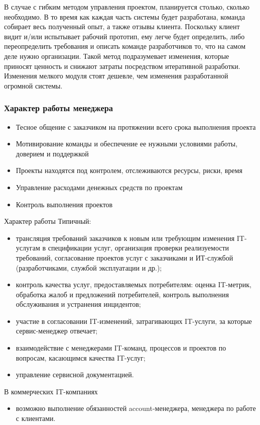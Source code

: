 \documentclass{../industrial-development}
\begin{document}
В случае с гибким методом управления проектом, планируется столько, сколько необходимо. В то время как каждая часть системы будет разработана, команда собирает весь полученный опыт, а также отзывы клиента. Поскольку клиент видит и/или испытывает рабочий прототип, ему легче будет определить, либо переопределить требования и описать команде разработчиков то, что на самом деле нужно организации. Такой метод подразумевает изменения, которые приносят ценность и снижают затраты посредством итеративной разработки. Изменения мелкого модуля стоят дешевле, чем изменения разработанной огромной системы.

\begin{frame} \frametitle{Характер работы менеджера}
\begin{itemize}
\item Тесное общение с заказчиком на протяжении всего срока выполнения проекта
\item Мотивирование команды и обеспечение ее нужными условиями работы, доверием и поддержкой
\item Проекты находятся под контролем, отслеживаются ресурсы, риски, время
\item Управление расходами денежных средств по проектам 
\item Контроль выполнения проектов
\end{itemize}
\end{frame}
\lecturenotes
Характер работы
Типичный:
\begin{itemize}
\item трансляция требований заказчиков к новым или требующим изменения IT-услугам в спецификации услуг, организация проверки реализуемости требований, согласование проектов услуг с заказчиками и ИТ-службой (разработчиками, службой эксплуатации и др.);
\item контроль качества услуг, предоставляемых потребителям: оценка IT-метрик, обработка жалоб и предложений потребителей, контроль выполнения обслуживания и устранения инцидентов;
\item участие в согласовании IT-изменений, затрагивающих IT-услуги, за которые сервис-менеджер отвечает;
\item взаимодействие с менеджерами IT-команд, процессов и проектов по вопросам, касающимся качества IT-услуг;
\item управление сервисной документацией.
 \end{itemize}
В коммерческих IT-компаниях
\begin{itemize}
	 \item возможно выполнение обязанностей account-менеджера, менеджера по работе с клиентами.
 \end{itemize}
\end{document}
